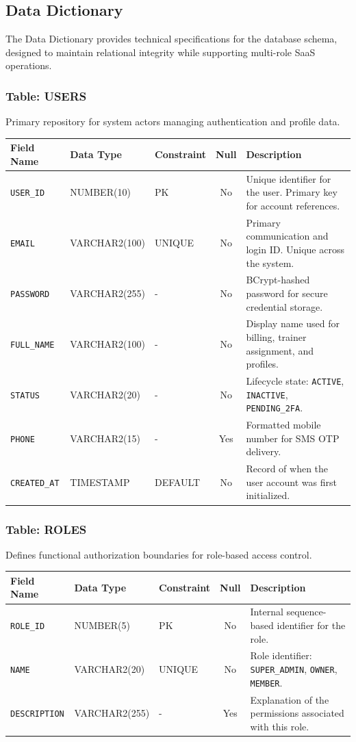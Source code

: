 \documentclass[
  12pt,
  a4paperpaper,
]{report}
\newcounter{none} %
\begin{document}
\subsection{Data Dictionary}

The Data Dictionary provides technical specifications for the database schema, designed to maintain relational integrity while supporting multi-role SaaS operations.

\subsubsection{Table: USERS}
Primary repository for system actors managing authentication and profile data.

{\def\LTcaptype{none}
\begin{longtable}[]{@{}lllc p{5.5cm}@{}}
\hline
\textbf{Field Name} & \textbf{Data Type} & \textbf{Constraint} & \textbf{Null} & \textbf{Description} \\
\hline
\endhead
\hline
\endlastfoot
\texttt{USER\_ID} & NUMBER(10) & PK & No & Unique identifier for the user. Primary key for account references. \\
\texttt{EMAIL} & VARCHAR2(100) & UNIQUE & No & Primary communication and login ID. Unique across the system. \\
\texttt{PASSWORD} & VARCHAR2(255) & - & No & BCrypt-hashed password for secure credential storage. \\
\texttt{FULL\_NAME} & VARCHAR2(100) & - & No & Display name used for billing, trainer assignment, and profiles. \\
\texttt{STATUS} & VARCHAR2(20) & - & No & Lifecycle state: \texttt{ACTIVE}, \texttt{INACTIVE}, \texttt{PENDING\_2FA}. \\
\texttt{PHONE} & VARCHAR2(15) & - & Yes & Formatted mobile number for SMS OTP delivery. \\
\texttt{CREATED\_AT} & TIMESTAMP & DEFAULT & No & Record of when the user account was first initialized. \\
\hline
\end{longtable}
}

\subsubsection{Table: ROLES}
Defines functional authorization boundaries for role-based access control.

{\def\LTcaptype{none}
\begin{longtable}[]{@{}lllc p{5.5cm}@{}}
\hline
\textbf{Field Name} & \textbf{Data Type} & \textbf{Constraint} & \textbf{Null} & \textbf{Description} \\
\hline
\endhead
\hline
\endlastfoot
\texttt{ROLE\_ID} & NUMBER(5) & PK & No & Internal sequence-based identifier for the role. \\
\texttt{NAME} & VARCHAR2(20) & UNIQUE & No & Role identifier: \texttt{SUPER\_ADMIN}, \texttt{OWNER}, \texttt{MEMBER}. \\
\texttt{DESCRIPTION} & VARCHAR2(255) & - & Yes & Explanation of the permissions associated with this role. \\
\hline
\end{longtable}
}
\end{document}
